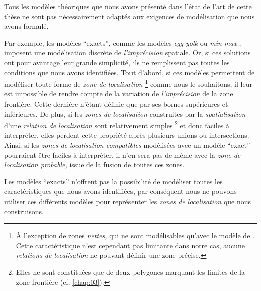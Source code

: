 Tous les modèles théoriques que nous avons présenté dans l'état de
l'art de cette thèse ne sont pas nécessairement adaptés aux exigences
de modélisation que nous avons formulé.


Par exemple, les modèles \enquote{exacts}, comme les modèles
\emph{egg-yolk} \autocite{Cohn1996} ou \emph{min-max}
\autocite{Clementini1996}, imposent une modélisation discrète de
\emph{l'imprécision} spatiale. Or, si ces solutions ont pour avantage
leur grande simplicité, ils ne remplissent pas toutes les conditions
que nous avons identifiées. Tout d'abord, si ces modèles permettent de
modéliser toute forme de \emph{zone de localisation} \footnote{À
  l'exception de zones \emph{nettes,} qui ne sont modélisables qu'avec
  le modèle de \textcite{Bejaoui2009}. Cette caractéristique n'est
  cependant pas limitante dans notre cas, aucune \emph{relations de
    localisation} ne pouvant définir une zone précise.} comme nous le
souhaitons, il leur est impossible de rendre compte de la variation de
\emph{l'imprécision} de la zone frontière. Cette dernière n'étant
définie que par ses bornes supérieures et inférieures. De plus, si les
\emph{zones de localisation} construites par la \emph{spatialisation}
d'une \emph{relation de localisation} sont relativement simples
\footnote{Elles ne sont constituées que de deux polygones marquant les
  limites de la zone frontière (cf. \autoref{chap:03}).} et donc
faciles à interpréter, elles perdent cette propriété après plusieurs
unions ou intersections.
%
Ainsi, si les \emph{zones de localisation compatibles} modélisées avec
un modèle \enquote{exact} pourraient être faciles à interpréter, il
n'en sera pas de même avec la \emph{zone de localisation probable,}
issue de la fusion de toutes ces zones.

Les modèles \enquote{exacts} n'offrent pas la possibilité de modéliser
toutes les caractéristiques que nous avons identifiées, par conséquent
nous ne pouvons utiliser ces différents modèles pour représenter les
\emph{zones de localisation} que nous construisons.




